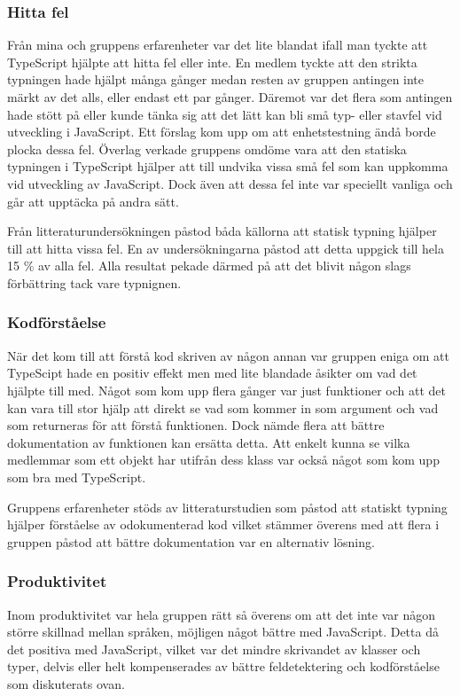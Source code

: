 \subsubsection{Hitta fel}
Från mina och gruppens erfarenheter var det lite blandat ifall man tyckte att TypeScript hjälpte att hitta fel eller inte. En medlem tyckte att den strikta typningen hade hjälpt många gånger medan resten av gruppen antingen inte märkt av det alls, eller endast ett par gånger. Däremot var det flera som antingen hade stött på eller kunde tänka sig att det lätt kan bli små typ- eller stavfel vid utveckling i JavaScript. Ett förslag kom upp om att enhetstestning ändå borde plocka dessa fel. Överlag verkade gruppens omdöme vara att den statiska typningen i TypeScript hjälper att till undvika vissa små fel som kan uppkomma vid utveckling av JavaScript. Dock även att dessa fel inte var speciellt vanliga och går att upptäcka på andra sätt.

Från litteraturundersökningen påstod båda källorna att statisk typning hjälper till att hitta vissa fel. En av undersökningarna påstod att detta uppgick till hela 15 \% av alla fel. \cite{henrik_totypeornot} Alla resultat pekade därmed på att det blivit någon slags förbättring tack vare typnignen.
\subsubsection{Kodförståelse}
När det kom till att förstå kod skriven av någon annan var gruppen eniga om att TypeScipt hade en positiv effekt men med lite blandade åsikter om vad det hjälpte till med. Något som kom upp flera gånger var just funktioner och att det kan vara till stor hjälp att direkt se vad som kommer in som argument och vad som returneras för att förstå funktionen. Dock nämde flera att bättre dokumentation av funktionen kan ersätta detta. Att enkelt kunna se vilka medlemmar som ett objekt har utifrån dess klass var också något som kom upp som bra med TypeScript.

Gruppens erfarenheter stöds av litteraturstudien som påstod att statiskt typning hjälper förståelse av odokumenterad kod \cite{henrik_maintainability} vilket stämmer överens med att flera i gruppen påstod att bättre dokumentation var en alternativ lösning.
\subsubsection{Produktivitet}
Inom produktivitet var hela gruppen rätt så överens om att det inte var någon större skillnad mellan språken, möjligen något bättre med JavaScript. Detta då det positiva med JavaScript, vilket var det mindre skrivandet av klasser och typer, delvis eller helt kompenserades av bättre feldetektering och kodförståelse som diskuterats ovan.

